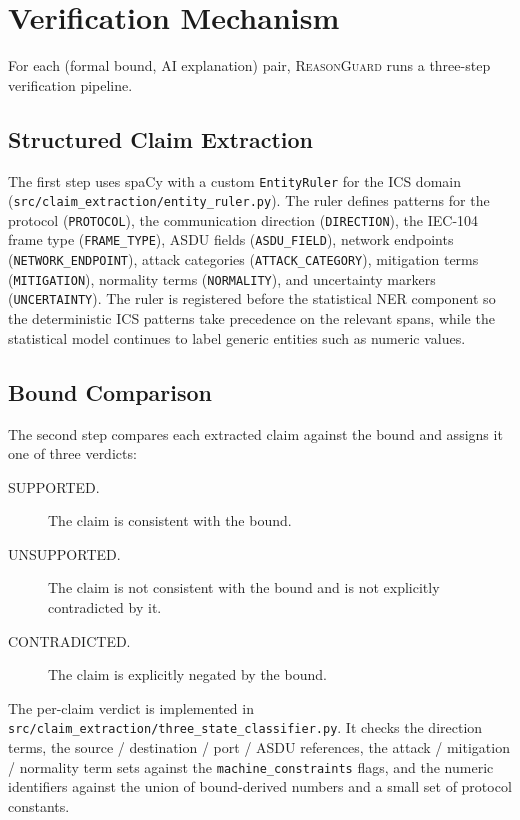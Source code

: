 \section{Verification Mechanism}
\label{sec:detection}

For each (formal bound, AI explanation) pair, \textsc{ReasonGuard} runs a
three-step verification pipeline.

\subsection{Structured Claim Extraction}
\label{subsec:claim-extraction}

The first step uses spaCy with a custom \texttt{EntityRuler} for the ICS
domain (\texttt{src/claim\_extraction/entity\_ruler.py}). The ruler defines
patterns for the protocol (\texttt{PROTOCOL}), the communication direction
(\texttt{DIRECTION}), the IEC-104 frame type (\texttt{FRAME\_TYPE}), ASDU
fields (\texttt{ASDU\_FIELD}), network endpoints
(\texttt{NETWORK\_ENDPOINT}), attack categories (\texttt{ATTACK\_CATEGORY}),
mitigation terms (\texttt{MITIGATION}), normality terms
(\texttt{NORMALITY}), and uncertainty markers (\texttt{UNCERTAINTY}). The
ruler is registered before the statistical NER component so the deterministic
ICS patterns take precedence on the relevant spans, while the statistical
model continues to label generic entities such as numeric values.

\subsection{Bound Comparison}
\label{subsec:bound-comparison}

The second step compares each extracted claim against the bound and assigns
it one of three verdicts:

\begin{description}
  \item[SUPPORTED.] The claim is consistent with the bound.
  \item[UNSUPPORTED.] The claim is not consistent with the bound and is not
        explicitly contradicted by it.
  \item[CONTRADICTED.] The claim is explicitly negated by the bound.
\end{description}

The per-claim verdict is implemented in
\texttt{src/claim\_extraction/three\_state\_classifier.py}. It checks the
direction terms, the source / destination / port / ASDU references, the
attack / mitigation / normality term sets against the
\texttt{machine\_constraints} flags, and the numeric identifiers against
the union of bound-derived numbers and a small set of protocol constants.

